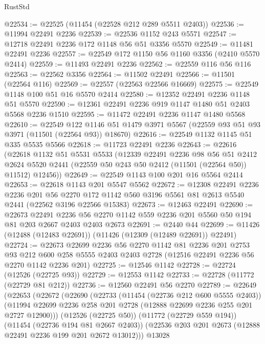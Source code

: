 \begin{lexlean}{RustStd}
\begin{coremodule}
@22534 := @22525 (@11454 (@22528 @212 @289 @5511 @2403))
@22536 := @11994 @22491 @2236
@22539 := @22536 @1152 @243 @5571
@22547 := @12718 @22491 @2236 @172 @1148 @56 @51 @3356 @5570
@22549 := @11481 @22491 @2236
@22557 := @22549 @172 @1150 @56 @1160 @3356 (@2410 @5570 @2414)
@22559 := @11493 @22491 @2236
@22562 := @22559 @116 @56 @116
@22563 := @22562 @3356
@22564 := @11502 @22491
@22566 := @11501 (@22564 @116)
@22569 := @22557 (@22563 @22566 @16669)
@22575 := @22549 @1148 @100 @51 @16 @5570 @2414
@22580 := @12352 @22491 @2236 @1148 @51 @5570
@22590 := @12361 @22491 @2236 @919 @1147 @1480 @51 @2403 @5568 @2236 @1510
@22595 := @11472 @22491 @2236 @1147 @1480 @5568
@22610 := @22549
    @122
    @1146
    @51
    @1479
    @3971
    @5567
    (@22559 @93 @51 @93 @3971 (@11501 (@22564 @93)) @18670)
@22616 := @22549 @1132 @1145 @51 @335 @5535 @5566
@22618 := @11723 @22491 @2236
@22643 := @22616
    (@22618
      @1132
      @51
      @5531
      @5533
      (@12339
        @22491
        @2236
        @98
        @56
        @51
        @2412
        @2624
        @5520
        @2441
        (@22559 @50 @243 @50 @2412 (@11501 (@22564 @50)) @11512)
        @12456))
@22649 := @22549 @1143 @100 @201 @16 @5564 @2414
@22653 := @22618 @1143 @201 @5547 @5562
@22672 := @12308
    @22491
    @2236
    @2236
    @201
    @56
    @2270
    @172
    @1142
    @560
    @3196
    @5561
    @81
    @2613
    @5540
    @2441
    (@22562 @3196 @22566 @15383)
@22673 := @12463 @22491
@22690 := @22673
    @22491
    @2236
    @56
    @2270
    @1142
    @559
    @2236
    @201
    @5560
    @50
    @194
    @81
    @203
    @2667
    @2403
    @2403
    @2673
@22691 := @2440 @44
@22699 := @11426 (@12488 (@12483 @22691)) (@11426 (@12309 (@12489 @22691)) @22491)
@22724 := @22673
    @22699
    @2236
    @56
    @2270
    @1142
    @81
    @2236
    @201
    @2753
    @93
    @212
    @600
    @258
    @5555
    @2403
    @2403
    @2728
    (@12516 @22491 @2236 @56 @2270 @1142 @2236 @201)
@22725 := @12546 @1142
@22728 := @22724 (@12526 (@22725 @93))
@22729 := @12553 @1142
@22733 := @22728 (@11772 (@22729 @81 @212))
@22736 := @12560 @22491 @56 @2270
@22789 := @22649
    (@22653
      (@22672
        (@22690
          (@22733
            (@11454 (@22736 @212 @600 @5555 @2403))
            (@11994 @22699 @2236 @258 @201 @2728 (@12888 @22699 @2236 @255 @201 @2727 @12900)))
          (@12526 (@22725 @50))
          (@11772 (@22729 @559 @194))
          (@11454 (@22736 @194 @81 @2667 @2403))
          (@22536 @203 @201 @2673 (@12888 @22491 @2236 @199 @201 @2672 @13012)))
        @13028

\end{coremodule}
\end{lexlean}
